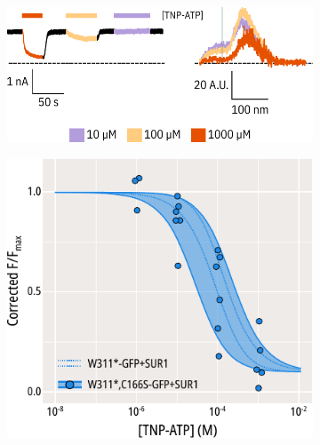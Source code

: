 \begin{figure}[h]
	\centering
	\begin{subfigure}[t]{0.6\textwidth}
		\caption{}\label{ch5fig:c166s_traces}
		\centering
		\includegraphics[width=\textwidth]{c166s_5.pdf}
	\end{subfigure}
	\hfill
	\begin{subfigure}[t]{0.3\textwidth}
		\caption{}\label{ch5fig:c166s_popfits_2}
		\centering
		\includegraphics[width=\textwidth]{c166s_6.pdf}
	\end{subfigure}
	\vfill
	\begin{subfigure}[t]{0.3\textwidth}
		\caption{}\label{ch5fig:c166s_popfits_3}
		\centering

\end{subfigure}
\end{figure}
